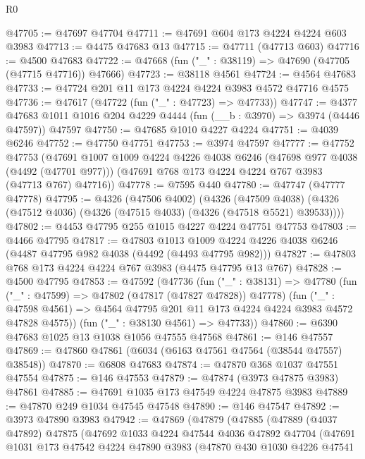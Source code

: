 \begin{lexlean}{R0}
\begin{coremodule}
@47705 := @47697 @47704
@47711 := @47691 @604 @173 @4224 @4224 @603 @3983
@47713 := @4475 @47683 @13
@47715 := @47711 (@47713 @603)
@47716 := @4500 @47683
@47722 := @47668 (fun ("_" : @38119) => @47690 (@47705 (@47715 @47716)) @47666)
@47723 := @38118 @4561
@47724 := @4564 @47683
@47733 := @47724 @201 @11 @173 @4224 @4224 @3983 @4572 @47716 @4575
@47736 := @47617 (@47722 (fun ("_" : @47723) => @47733))
@47747 := @4377
    @47683
    @1011
    @1016
    @204
    @4229
    @4444
    (fun (__b : @3970) => @3974 (@4446 @47597))
    @47597
@47750 := @47685 @1010 @4227 @4224
@47751 := @4039 @6246
@47752 := @47750 @47751
@47753 := @3974 @47597
@47777 := @47752
    @47753
    (@47691
      @1007
      @1009
      @4224
      @4226
      @4038
      @6246
      (@47698 @977 @4038 (@4492 (@47701 @977)))
      (@47691 @768 @173 @4224 @4224 @767 @3983 (@47713 @767) @47716))
@47778 := @7595 @440
@47780 := @47747 (@47777 @47778)
@47795 := @4326
    (@47506 @4002)
    (@4326
      (@47509 @4038)
      (@4326 (@47512 @4036) (@4326 (@47515 @4033) (@4326 (@47518 @5521) @39533))))
@47802 := @4453 @47795 @255 @1015 @4227 @4224 @47751 @47753
@47803 := @4466 @47795
@47817 := @47803
    @1013
    @1009
    @4224
    @4226
    @4038
    @6246
    (@4487 @47795 @982 @4038 (@4492 (@4493 @47795 @982)))
@47827 := @47803 @768 @173 @4224 @4224 @767 @3983 (@4475 @47795 @13 @767)
@47828 := @4500 @47795
@47853 := @47592
    (@47736
      (fun ("_" : @38131) =>
      @47780
        (fun ("_" : @47599) => @47802 (@47817 (@47827 @47828)) @47778)
        (fun ("_" : @47598 @4561) =>
        @4564 @47795 @201 @11 @173 @4224 @4224 @3983 @4572 @47828 @4575))
      (fun ("_" : @38130 @4561) => @47733))
@47860 := @6390 @47683 @1025 @13 @1038 @1056 @47555 @47568
@47861 := @146 @47557
@47869 := @47860 @47861 (@6034 (@6163 @47561 @47564 (@38544 @47557) @38548))
@47870 := @6808 @47683
@47874 := @47870 @368 @1037 @47551 @47554
@47875 := @146 @47553
@47879 := @47874 (@3973 @47875 @3983) @47861
@47885 := @47691 @1035 @173 @47549 @4224 @47875 @3983
@47889 := @47870 @249 @1034 @47545 @47548
@47890 := @146 @47547
@47892 := @3973 @47890 @3983
@47942 := @47869
    (@47879
      (@47885
        (@47889
          (@4037 @47892)
          @47875
          (@47692
            @1033
            @4224
            @47544
            @4036
            @47892
            @47704
            (@47691
              @1031
              @173
              @47542
              @4224
              @47890
              @3983
              (@47870
                @430
                @1030
                @4226
                @47541

\end{coremodule}
\end{lexlean}
